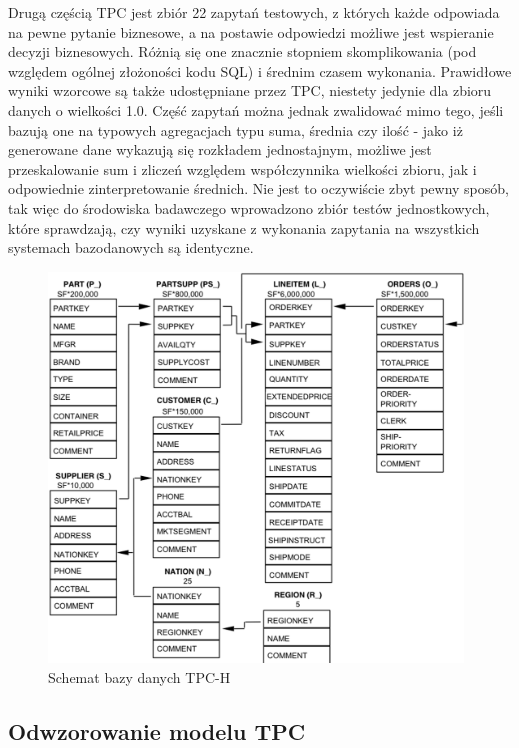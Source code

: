 \documentclass[12pt]{extarticle}
\begin{document}
    Drugą częścią TPC jest zbiór 22 zapytań testowych, z których każde odpowiada na pewne pytanie biznesowe, a na postawie odpowiedzi możliwe jest wspieranie decyzji biznesowych. Różnią się one znacznie stopniem skomplikowania (pod względem ogólnej złożoności kodu SQL) i średnim czasem wykonania. Prawidłowe wyniki wzorcowe są także udostępniane przez TPC, niestety jedynie dla zbioru danych o wielkości 1.0. Część zapytań można jednak zwalidować mimo tego, jeśli bazują one na typowych agregacjach typu suma, średnia czy ilość - jako iż generowane dane wykazują się rozkładem jednostajnym, możliwe jest przeskalowanie sum i zliczeń względem współczynnika wielkości zbioru, jak i odpowiednie zinterpretowanie średnich. Nie jest to oczywiście zbyt pewny sposób, tak więc do środowiska badawczego wprowadzono zbiór testów jednostkowych, które sprawdzają, czy wyniki uzyskane z wykonania zapytania na wszystkich systemach bazodanowych są identyczne.

\begin{figure}
\centering
\includegraphics[width=11cm]{tpc-schema.png}
\caption{Schemat bazy danych TPC-H}
\label{fig:tpcschema}
\end{figure}


\subsection{Odwzorowanie modelu TPC}
\end{document}

